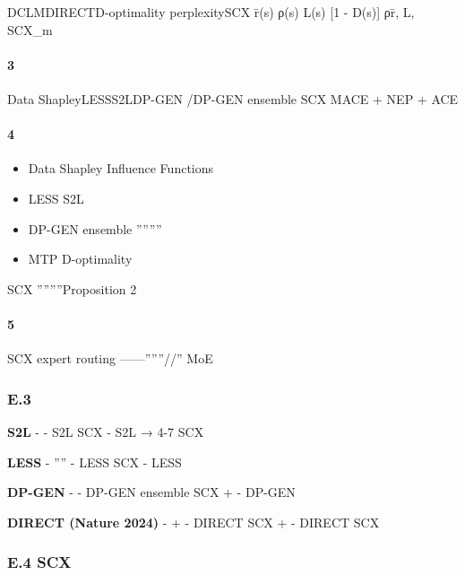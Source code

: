 \documentclass[
  12pt,
]{article}
\providecommand{\tightlist}{%
  \setlength{\itemsep}{0pt}\setlength{\parskip}{0pt}}
\begin{document}
DCLMDIRECTD-optimality
\textbf{}perplexitySCX
 r̄(s)  ρ(s)  L(s)  {[}1 - D(s){]}
ρr̄, L, SCX\_m

\paragraph{
3}\label{ux4e0dux80fdux66ffux4ee3ux7684ux7406ux7531-3ux591aux4e13ux5bb6ux672aux88abux6574ux5408}

Data ShapleyLESSS2LDP-GEN /DP-GEN  ensemble
\textbf{}\textbf{}SCX
 MACE + NEP + ACE


\paragraph{
4}\label{ux4e0dux80fdux66ffux4ee3ux7684ux7406ux7531-4ux566aux58f0ux5904ux7406ux4e0dux8db3}

\begin{itemize}
\tightlist
\item
  Data Shapley  Influence Functions 
\item
  LESS  S2L 
\item
  DP-GEN  ensemble ''''''''
\item
  MTP  D-optimality 
\end{itemize}

SCX ''''''''Proposition
2 

\paragraph{
5}\label{ux4e0dux80fdux66ffux4ee3ux7684ux7406ux7531-5ux6ca1ux6709ux8defux7531}

SCX  expert routing
------''''''//''
MoE 

\subsubsection{E.3
}\label{e.3-ux4e0eux6700ux63a5ux8fd1ux65b9ux6cd5ux7684ux9010ux4e00ux5bf9ux6bd4}

\textbf{S2L} -
 - S2L
SCX
 - S2L  →  4-7
SCX 

\textbf{LESS} - '''' -
LESS SCX  -
LESS 

\textbf{DP-GEN} -
 - DP-GEN 
ensemble SCX  +  -
DP-GEN 

\textbf{DIRECT (Nature 2024)} -  +
 - DIRECT SCX  +
 - DIRECT  SCX 

\subsubsection{E.4 SCX
}\label{e.4-scx-ux7684ux6f5cux5728ux5f31ux70b9}
\end{document}
